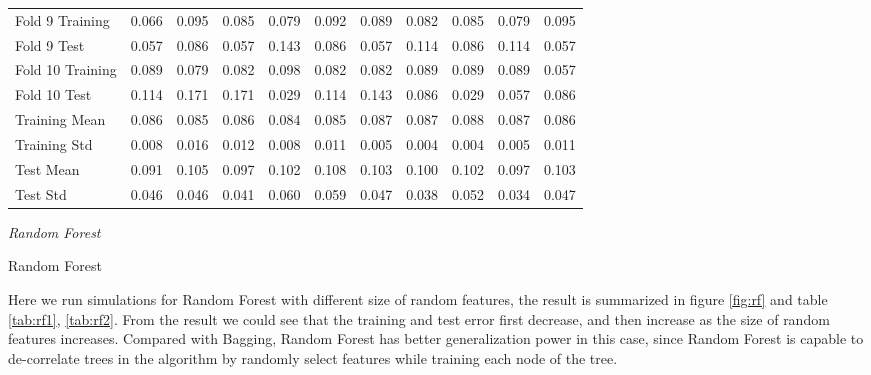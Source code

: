 \documentclass[12pt,oneside,a4paper]{article}
\begin{document}
\begin{table}[ht]
\begin{tabular}{lrrrrrrrrrr}
  Fold 9 Training & 0.066 & 0.095 & 0.085 & 0.079 & 0.092 & 0.089 & 0.082 & 0.085 & 0.079 & 0.095 \\
  Fold 9 Test & 0.057 & 0.086 & 0.057 & 0.143 & 0.086 & 0.057 & 0.114 & 0.086 & 0.114 & 0.057 \\
  Fold 10 Training & 0.089 & 0.079 & 0.082 & 0.098 & 0.082 & 0.082 & 0.089 & 0.089 & 0.089 & 0.057 \\
  Fold 10 Test & 0.114 & 0.171 & 0.171 & 0.029 & 0.114 & 0.143 & 0.086 & 0.029 & 0.057 & 0.086 \\
  Training Mean & 0.086 & 0.085 & 0.086 & 0.084 & 0.085 & 0.087 & 0.087 & 0.088 & 0.087 & 0.086 \\
  Training Std & 0.008 & 0.016 & 0.012 & 0.008 & 0.011 & 0.005 & 0.004 & 0.004 & 0.005 & 0.011 \\
  Test Mean & 0.091 & 0.105 & 0.097 & 0.102 & 0.108 & 0.103 & 0.100 & 0.102 & 0.097 & 0.103 \\
  Test Std & 0.046 & 0.046 & 0.041 & 0.060 & 0.059 & 0.047 & 0.038 & 0.052 & 0.034 & 0.047 \\
   \bottomrule
\end{tabular}
\label{tab:bg}
\end{table}
\clearpage

\emph{Random Forest}

\begin{algorithm}
\caption{Random Forest}\label{algo_rf}
\end{algorithm}

Here we run simulations for Random Forest with different size of random features, the result is summarized in figure \ref{fig:rf} and table \ref{tab:rf1}, \ref{tab:rf2}. From the result we could see that the training and test error first decrease, and then increase as the size of random features increases. Compared with Bagging, Random Forest has better generalization power in this case, since Random Forest is capable to de-correlate trees in the algorithm by randomly select features while training each node of the tree.
\end{document}
